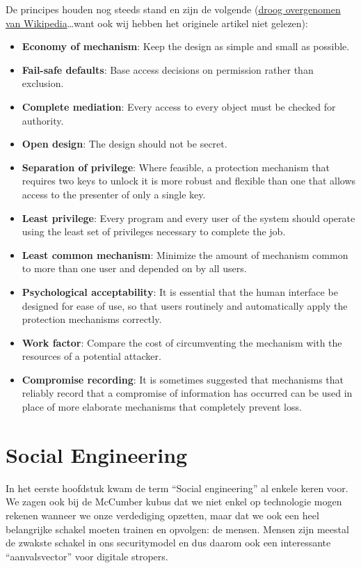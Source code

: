 \documentclass[
  10pt,
  dutch,
  paper=a4,
  ,captions=tableheading
]{scrbook}
\providecommand{\tightlist}{%
  \setlength{\itemsep}{0pt}\setlength{\parskip}{0pt}}
\begin{document}
De principes houden nog steeds stand en zijn de volgende
(\href{https://en.wikipedia.org/wiki/Saltzer_and_Schroeder\%27s_design_principles}{droog
overgenomen van Wikipedia}\ldots want ook wij hebben het originele
artikel niet gelezen):

\begin{itemize}
\tightlist
\item
  \textbf{Economy of mechanism}: Keep the design as simple and small as
  possible.
\item
  \textbf{Fail-safe defaults}: Base access decisions on permission
  rather than exclusion.
\item
  \textbf{Complete mediation}: Every access to every object must be
  checked for authority.
\item
  \textbf{Open design}: The design should not be secret.
\item
  \textbf{Separation of privilege}: Where feasible, a protection
  mechanism that requires two keys to unlock it is more robust and
  flexible than one that allows access to the presenter of only a single
  key.
\item
  \textbf{Least privilege}: Every program and every user of the system
  should operate using the least set of privileges necessary to complete
  the job.
\item
  \textbf{Least common mechanism}: Minimize the amount of mechanism
  common to more than one user and depended on by all users.
\item
  \textbf{Psychological acceptability}: It is essential that the human
  interface be designed for ease of use, so that users routinely and
  automatically apply the protection mechanisms correctly.
\item
  \textbf{Work factor}: Compare the cost of circumventing the mechanism
  with the resources of a potential attacker.
\item
  \textbf{Compromise recording}: It is sometimes suggested that
  mechanisms that reliably record that a compromise of information has
  occurred can be used in place of more elaborate mechanisms that
  completely prevent loss.
\end{itemize}

\section{Social Engineering}\label{social-engineering}

In het eerste hoofdstuk kwam de term ``Social engineering'' al enkele
keren voor. We zagen ook bij de McCumber kubus dat we niet enkel op
technologie mogen rekenen wanneer we onze verdediging opzetten, maar dat
we ook een heel belangrijke schakel moeten trainen en opvolgen: de
mensen. Mensen zijn meestal de zwakste schakel in ons securitymodel en
dus daarom ook een interessante ``aanvalsvector'' voor digitale
stropers.
\end{document}
